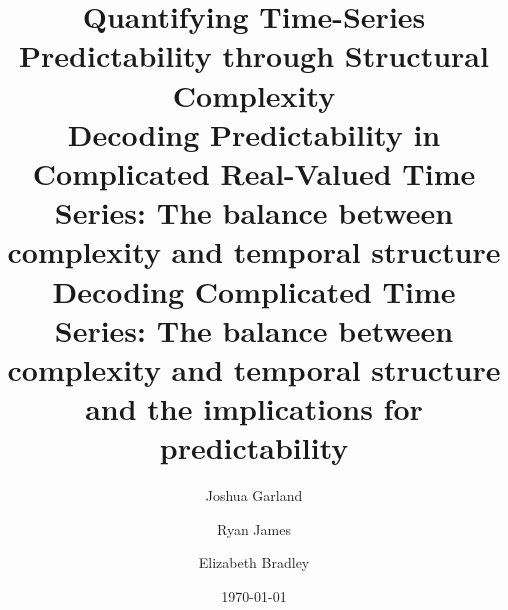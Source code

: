 \documentclass[%
 reprint,
nofootinbib,
nobibnotes,
 amsmath,amssymb,
]{revtex4-1}
\begin{document}


\title{
{\color{green}Quantifying Time-Series Predictability through Structural Complexity} 
\\Decoding Predictability in Complicated Real-Valued Time Series: The balance between complexity and temporal structure
\\Decoding Complicated Time Series: The balance between complexity and temporal structure and the implications for predictability
}






\author{Joshua Garland}
\author{Ryan James}%
%
\author{Elizabeth Bradley}
%
%



\date{\today}%
\end{document}
